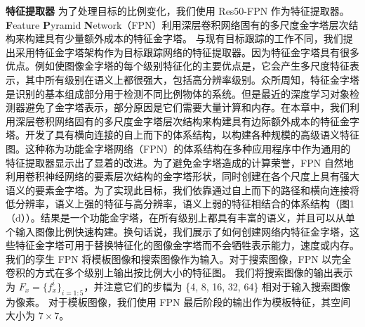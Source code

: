 \textbf{特征提取器} 为了处理目标的比例变化，我们使用 Res50-FPN \cite{lin2017feature} 作为特征提取器。
\textbf{F}eature \textbf{P}yramid \textbf{N}etwork（FPN）利用深层卷积网络固有的多尺度金字塔层次结构来构建具有少量额外成本的特征金字塔。
与现有目标跟踪的工作不同，我们提出采用特征金字塔架构作为目标跟踪网络的特征提取器。因为特征金字塔具有很多优点。例如使图像金字塔的每个级别特征化的主要优点是，它会产生多尺度特征表示，其中所有级别在语义上都很强大，包括高分辨率级别。众所周知，特征金字塔是识别的基本组成部分用于检测不同比例物体的系统。但是最近的深度学习对象检测器避免了金字塔表示，部分原因是它们需要大量计算和内存。在本章中，我们利用深层卷积网络固有的多尺度金字塔层次结构来构建具有边际额外成本的特征金字塔。开发了具有横向连接的自上而下的体系结构，以构建各种规模的高级语义特征图。这种称为功能金字塔网络（FPN）的体系结构在多种应用程序中作为通用的特征提取器显示出了显着的改进。为了避免金字塔造成的计算荣誉，FPN 自然地利用卷积神经网络的要素层次结构的金字塔形状，同时创建在各个尺度上具有强大语义的要素金字塔。为了实现此目标，我们依靠通过自上而下的路径和横向连接将低分辨率，语义上强的特征与高分辨率，语义上弱的特征相结合的体系结构（图1（d））。结果是一个功能金字塔，在所有级别上都具有丰富的语义，并且可以从单个输入图像比例快速构建。换句话说，我们展示了如何创建网络内特征金字塔，这些特征金字塔可用于替换特征化的图像金字塔而不会牺牲表示能力，速度或内存。%
我们的孪生 FPN 将模板图像和搜索图像作为输入。对于搜索图像，FPN 以完全卷积的方式在多个级别上输出按比例大小的特征图。
我们将搜索图像的输出表示为 $F_{x} = \{f_{x}^i\}_{i=1:5}$，并注意它们的步幅为 \{4, 8, 16, 32, 64\} 相对于输入搜索图像为像素。
对于模板图像，我们使用 FPN 最后阶段的输出作为模板特征，其空间大小为 $7 \times 7$。

